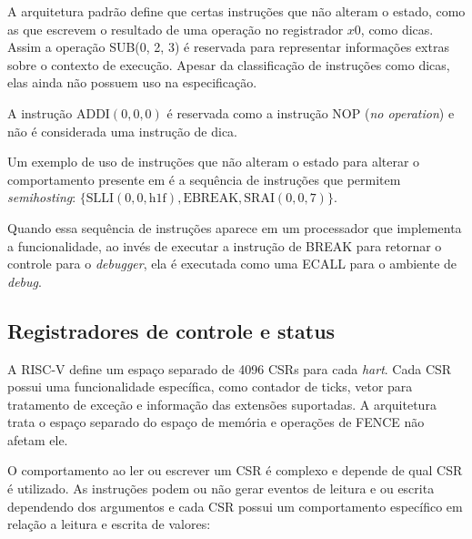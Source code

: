   A arquitetura padrão define que certas instruções que não alteram o estado, como as que escrevem
  o resultado de uma operação no registrador $x0$, como dicas. Assim a operação
  SUB(0, 2, 3) é reservada para representar informações extras sobre o contexto de execução.
  Apesar da classificação de instruções como dicas, elas ainda não possuem uso na especificação.

  A instrução ADDI$(0, 0, 0)$ é reservada como a instrução NOP (\emph{no operation}) e não é considerada
  uma instrução de dica.

  Um exemplo de uso de instruções que não alteram o estado para alterar o comportamento presente em \cite{RVS1}
  é a sequência de instruções que permitem \emph{semihosting}: $\{ \text{SLLI}(0, 0, \text{h1f}),  \text{EBREAK}, \text{SRAI}(0, 0, 7)\}$.

  Quando essa sequência de instruções aparece em um processador que implementa a funcionalidade,
  ao invés de executar a instrução de BREAK para retornar o controle para o \emph{debugger},
  ela é executada como uma ECALL para o ambiente de \emph{debug}.

\subsection{Registradores de controle e status}
\label{sec:CSRs}

  A RISC-V define um espaço separado de 4096 CSRs para cada \emph{hart}. Cada CSR possui uma funcionalidade específica, como
  contador de ticks, vetor para tratamento de exceção e informação das extensões suportadas. A arquitetura trata o espaço
  separado do espaço de memória e operações de FENCE não afetam ele.

  O comportamento ao ler ou escrever um CSR é complexo e depende de qual CSR é utilizado. As instruções podem ou não gerar
  eventos de leitura e ou escrita dependendo dos argumentos e cada CSR possui um comportamento específico em relação a leitura
  e escrita de valores:

